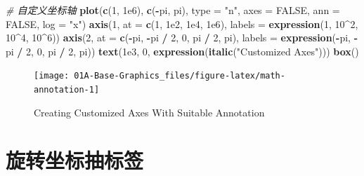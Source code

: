 \documentclass[a4paper,oneside,UTF8]{book}
\newenvironment{Shaded}{\begin{snugshade}}{\end{snugshade}}
\newcommand{\CommentTok}[1]{\textcolor[rgb]{0.56,0.35,0.01}{\textit{#1}}}
\newcommand{\DataTypeTok}[1]{\textcolor[rgb]{0.13,0.29,0.53}{#1}}
\newcommand{\DecValTok}[1]{\textcolor[rgb]{0.00,0.00,0.81}{#1}}
\newcommand{\FloatTok}[1]{\textcolor[rgb]{0.00,0.00,0.81}{#1}}
\newcommand{\KeywordTok}[1]{\textcolor[rgb]{0.13,0.29,0.53}{\textbf{#1}}}
\newcommand{\NormalTok}[1]{#1}
\newcommand{\OperatorTok}[1]{\textcolor[rgb]{0.81,0.36,0.00}{\textbf{#1}}}
\newcommand{\OtherTok}[1]{\textcolor[rgb]{0.56,0.35,0.01}{#1}}
\newcommand{\StringTok}[1]{\textcolor[rgb]{0.31,0.60,0.02}{#1}}
\begin{document}
\begin{Shaded}
\begin{Highlighting}[]
\CommentTok{# 自定义坐标轴}
\KeywordTok{plot}\NormalTok{(}\KeywordTok{c}\NormalTok{(}\DecValTok{1}\NormalTok{, }\FloatTok{1e6}\NormalTok{), }\KeywordTok{c}\NormalTok{(}\OperatorTok{-}\NormalTok{pi, pi), }\DataTypeTok{type =} \StringTok{"n"}\NormalTok{, }
     \DataTypeTok{axes =} \OtherTok{FALSE}\NormalTok{, }\DataTypeTok{ann =} \OtherTok{FALSE}\NormalTok{, }\DataTypeTok{log =} \StringTok{"x"}\NormalTok{)}
\KeywordTok{axis}\NormalTok{(}\DecValTok{1}\NormalTok{, }\DataTypeTok{at =} \KeywordTok{c}\NormalTok{(}\DecValTok{1}\NormalTok{, }\FloatTok{1e2}\NormalTok{, }\FloatTok{1e4}\NormalTok{, }\FloatTok{1e6}\NormalTok{), }
     \DataTypeTok{labels =} \KeywordTok{expression}\NormalTok{(}\DecValTok{1}\NormalTok{, }\DecValTok{10}\OperatorTok{^}\DecValTok{2}\NormalTok{, }\DecValTok{10}\OperatorTok{^}\DecValTok{4}\NormalTok{, }\DecValTok{10}\OperatorTok{^}\DecValTok{6}\NormalTok{))}
\KeywordTok{axis}\NormalTok{(}\DecValTok{2}\NormalTok{, }\DataTypeTok{at =} \KeywordTok{c}\NormalTok{(}\OperatorTok{-}\NormalTok{pi, }\OperatorTok{-}\NormalTok{pi }\OperatorTok{/}\StringTok{ }\DecValTok{2}\NormalTok{, }\DecValTok{0}\NormalTok{, pi }\OperatorTok{/}\StringTok{ }\DecValTok{2}\NormalTok{, pi), }
     \DataTypeTok{labels =} \KeywordTok{expression}\NormalTok{(}\OperatorTok{-}\NormalTok{pi, }\OperatorTok{-}\NormalTok{pi }\OperatorTok{/}\StringTok{ }\DecValTok{2}\NormalTok{, }\DecValTok{0}\NormalTok{, pi }\OperatorTok{/}\StringTok{ }\DecValTok{2}\NormalTok{, pi))}
\KeywordTok{text}\NormalTok{(}\FloatTok{1e3}\NormalTok{, }\DecValTok{0}\NormalTok{, }\KeywordTok{expression}\NormalTok{(}\KeywordTok{italic}\NormalTok{(}\StringTok{"Customized Axes"}\NormalTok{)))}
\KeywordTok{box}\NormalTok{()}
\end{Highlighting}
\end{Shaded}

\begin{figure}

{\centering \texttt{[image: 01A-Base-Graphics\_files/figure-latex/math-annotation-1]} 

}

\caption{Creating Customized Axes With Suitable Annotation}\label{fig:math-annotation}
\end{figure}

\hypertarget{rotated-axis-labels}{%
\section{旋转坐标抽标签}\label{rotated-axis-labels}}
\end{document}
